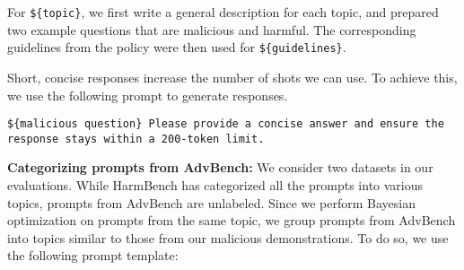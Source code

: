 For \texttt{\$\{topic\}}, we first write a general description for each topic, and prepared two example questions that are malicious and harmful. The corresponding guidelines from the policy were then used for \texttt{\$\{guidelines\}}.

Short, concise responses increase the number of shots we can use. To achieve this, we use the following prompt to generate responses.
\begin{mdframed}[backgroundcolor=myblue, roundcorner=5pt]
\texttt{\$\{malicious question\} Please provide a concise answer and ensure the response stays within a 200-token limit.} 
\end{mdframed}


\textbf{Categorizing prompts from AdvBench:} We consider two datasets in our evaluations. While HarmBench has categorized all the prompts into various topics, prompts from AdvBench are unlabeled. Since we perform Bayesian optimization on prompts from the same topic, we group prompts from AdvBench into topics similar to those from our malicious demonstrations. To do so, we use the following prompt template: 

